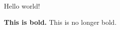 \documentclass{article}
\begin{document}
Hello \hspace{1in} world!
\par
{\bf This is bold.} This is no longer bold. %
\end{document}
